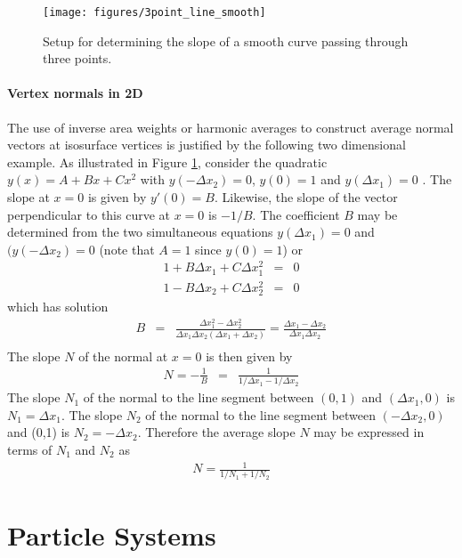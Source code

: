 \documentclass[11pt,twoside]{book}
\newcommand{\figoptions}{htp}
\begin{document}
%
%

\begin{figure}[\figoptions]
\begin{center}
\texttt{[image: figures/3point\_line\_smooth]}
\end{center}
\caption{Setup for determining the slope of a smooth curve passing through three points.}
\label{figlinesmooth}%
\end{figure}

\paragraph{Vertex normals in 2D} The use of inverse area weights or harmonic averages to construct average normal vectors at isosurface vertices is justified by the following two dimensional example.  As illustrated in Figure \ref{figlinesmooth}, consider the quadratic $y(x)=A+Bx+Cx^2$ with $y(-\Delta x_2)=0$, $y(0)=1$ and $y(\Delta x_1)=0$ .  The slope at $x=0$ is given by $y'(0)=B$.  Likewise, the slope of the vector perpendicular to this curve at $x=0$ is $-1/B$.  The coefficient $B$ may be determined from the two simultaneous equations $y(\Delta x_1)=0$ and  $(y(-\Delta x_2)=0$ (note that $A=1$ since $y(0)=1$) or
\begin{eqnarray*}
1+B\Delta x_1 + C \Delta x_1^2 &= &0\\
1-B\Delta x_2 + C \Delta x_2^2 &= &0
\end{eqnarray*}
which has solution
\begin{eqnarray*}
B&=&\frac{\Delta x_1^2-\Delta x_2^2}{\Delta x_1\Delta x_2(\Delta x_1+\Delta x_2)}=
\frac{\Delta x_1-\Delta x_2}{\Delta x_1\Delta x_2}\\
\end{eqnarray*}
The slope $N$ of the normal at $x=0$ is then given by
\begin{eqnarray*}
N=-\frac{1}{B}&=&\frac{1}{1/\Delta x_1-1/\Delta x_2}
\end{eqnarray*}
The slope $N_1$ of the normal to the line segment between $(0,1)$ and $(\Delta x_1,0)$ is $N_1=\Delta x_1$.
The slope $N_2$ of the normal to the line segment between $(-\Delta x_2,0)$ and (0,1) is $N_2=-\Delta x_2$.
Therefore the average slope $N$ may be expressed in terms of $N_1$ and $N_2$ as
\begin{eqnarray*}
N=\frac{1}{1/N_1+1/N_2}
\end{eqnarray*}

\section{Particle Systems}
\end{document}
